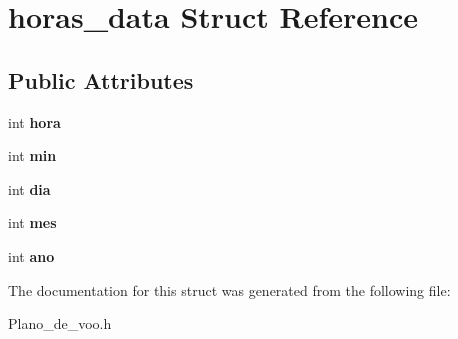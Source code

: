 \hypertarget{structhoras__data}{
\section{horas\_\-data Struct Reference}
\label{structhoras__data}
}
\subsection*{Public Attributes}
\begin{DoxyCompactItemize}
\item 
\hypertarget{structhoras__data_a27e8f9eccb555ae151178df297ac9e0a}{
int {\bfseries hora}}
\label{structhoras__data_a27e8f9eccb555ae151178df297ac9e0a}

\item 
\hypertarget{structhoras__data_afc1658273bbf3440f8811a10d220b6bd}{
int {\bfseries min}}
\label{structhoras__data_afc1658273bbf3440f8811a10d220b6bd}

\item 
\hypertarget{structhoras__data_acefbae1d0814d24439ccf21b55f65c73}{
int {\bfseries dia}}
\label{structhoras__data_acefbae1d0814d24439ccf21b55f65c73}

\item 
\hypertarget{structhoras__data_a8cce6449875abd7ce6cea1ad97304ea3}{
int {\bfseries mes}}
\label{structhoras__data_a8cce6449875abd7ce6cea1ad97304ea3}

\item 
\hypertarget{structhoras__data_ade0e8ea38ddb1a2f4c3cb8e99d6f52dd}{
int {\bfseries ano}}
\label{structhoras__data_ade0e8ea38ddb1a2f4c3cb8e99d6f52dd}

\end{DoxyCompactItemize}


The documentation for this struct was generated from the following file:\begin{DoxyCompactItemize}
\item 
Plano\_\-de\_\-voo.h\end{DoxyCompactItemize}
